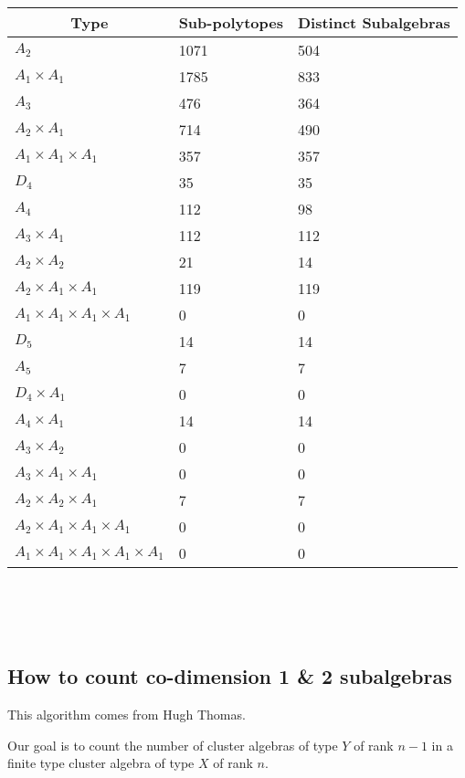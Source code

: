 \documentclass[12pt]{article}
\begin{document}
\begin{tabular}{ | l | l | l |}
\multicolumn{1}{c}{Type} &  \multicolumn{1}{c}{Sub-polytopes}  &  \multicolumn{1}{c}{Distinct Subalgebras} \\
\hline \(A_2\) & 1071 & 504 \\ 
\hline \(A_1 \times A_1\) & 1785 & 833 \\ \hline 
\hline \(A_3\) & 476 & 364 \\ 
\hline \(A_2 \times A_1\) & 714 & 490 \\ 
\hline \(A_1 \times A_1 \times A_1\) & 357 & 357 \\ \hline 
\hline \(D_4\) & 35 & 35 \\ 
\hline \(A_4\) & 112 & 98 \\ 
\hline \(A_3 \times A_1\) & 112 & 112 \\ 
\hline \(A_2 \times A_2\) & 21 & 14 \\ 
\hline \(A_2 \times A_1 \times A_1\) & 119 & 119 \\ 
\hline \(A_1 \times A_1 \times A_1 \times A_1\) & 0 & 0 \\ \hline 
\hline \(D_5\) & 14 & 14 \\ 
\hline \(A_5\) & 7 & 7 \\ 
\hline \(D_4 \times A_1\) & 0 & 0 \\ 
\hline \(A_4 \times A_1\) & 14 & 14 \\ 
\hline \(A_3 \times A_2\) & 0 & 0 \\ 
\hline \(A_3 \times A_1 \times A_1\) & 0 & 0 \\ 
\hline \(A_2 \times A_2 \times A_1\) & 7 & 7 \\ 
\hline \(A_2 \times A_1 \times A_1 \times A_1\) & 0 & 0 \\ 
\hline \(A_1 \times A_1 \times A_1 \times A_1 \times A_1\) & 0 & 0 \\ 
\hline
\end{tabular} \\ \\ \\


\pagebreak
\subsection*{How to count co-dimension 1 \& 2 subalgebras}

This algorithm comes from Hugh Thomas.

Our goal is to count the number of cluster algebras of type \(Y\) of rank \(n-1\) in a finite type cluster algebra of type \(X\) of rank \(n\).
\end{document}
